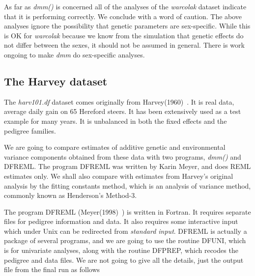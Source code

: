 \documentclass[titlepage]{article}  %
\begin{document}
As far as {\em dmm()} is concerned all of the analyses of the {\em warcolak} dataset indicate that it is performing correctly. We conclude with a word of caution. The above analyses ignore the possibility that genetic parameters are sex-specific. While this is OK for {\em warcolak} because we know from the simulation that genetic effects do not differ between the sexes, it should not be assumed in general. There is work ongoing to make {\em dmm} do sex-specific analyses. 

\clearpage
\subsection{The Harvey dataset}
 The {\em harv101.df} dataset comes originally from Harvey(1960)~\cite{harv:60}. It is real data, average daily gain on 65 Hereford steers. It has been extensively used as a test example for many years. It is unbalanced in both the fixed effects and the pedigree families.

We are going to compare estimates of additive genetic and environmental variance components obtained from these data with two programs, {\em dmm()} and DFREML. The program DFREML was written by Karin Meyer, and does REML estimates only. We shall also compare with estimates from Harvey's original analysis by the fitting constants method, which is an analysis of variance method, commonly known as Henderson's Method-3.

The program DFREML (Meyer(1998)~\cite{meye:98}) is written in Fortran. It requires separate files for pedigree information and data. It also requires some interactive input which under Unix can be redirected from {\em standard input}. DFREML is actually a package of several programs, and we are going to use the routine DFUNI, which is for univariate analyses, along with the routine DFPREP, which recodes the pedigree and data files. We are not going to give all the details, just the output file from the final run as follows
\end{document}
